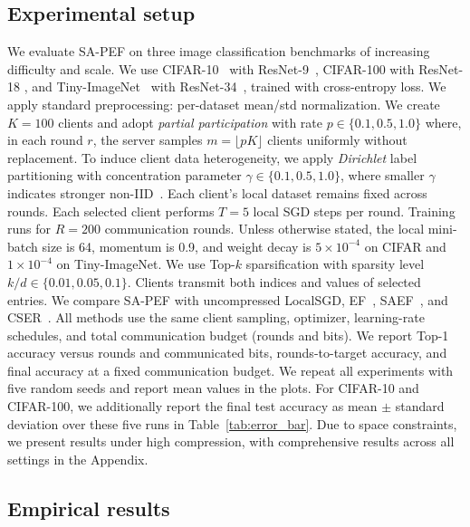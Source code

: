 \documentclass{article} %
\begin{document}
\subsection{Experimental setup}

We evaluate SA-PEF on three image classification benchmarks of increasing difficulty and scale. We use CIFAR-10~\citep{krizhevsky2009} with ResNet-9~\citep{page_cifar10_fast}, {CIFAR-100} \cite{krizhevsky2009} with {ResNet-18} \cite{he2016deep}, and {Tiny-ImageNet}~\citep{le2015tiny} with {ResNet-34}~\citep{he2016deep}, trained with cross-entropy loss. We apply standard preprocessing: per-dataset mean/std normalization. We create \(K=100\) clients and adopt \emph{partial participation} with rate \(p\in\{0.1,0.5,1.0\}\) where, in each round \(r\), the server samples \(m=\lfloor pK\rfloor\) clients uniformly without replacement. To induce client data heterogeneity, we apply \emph{Dirichlet} label partitioning with concentration parameter \(\gamma\in\{0.1,0.5,1.0\}\), where smaller \(\gamma\) indicates stronger non-IID~\citep{hsu2019measuring}. Each client’s local dataset remains fixed across rounds. Each selected client performs \(T=5\) local SGD steps per round. Training runs for \(R=200\) communication rounds. Unless otherwise stated, the local mini-batch size is 64, momentum is 0.9, and weight decay is \(5\times10^{-4}\) on CIFAR and \(1\times10^{-4}\) on Tiny-ImageNet. We use {Top-}\(k\) sparsification with sparsity level \(k/d\in\{0.01,0.05,0.1\}\). Clients transmit both indices and values of selected entries. We compare SA-PEF with {uncompressed LocalSGD}, {EF}~\citep{li2023analysis}, {SAEF}~\citep{xu2021step}, and {CSER}~\citep{xie2020cser}. All methods use the same client sampling, optimizer, learning-rate schedules, and total communication budget (rounds and bits). We report Top-1 accuracy versus rounds and communicated bits, rounds-to-target accuracy, and final accuracy at a fixed communication budget. We repeat all experiments with five random seeds and report mean values in the plots. For CIFAR-10 and CIFAR-100, we additionally report the final test accuracy as mean $\pm$ standard deviation over these five runs in Table~\ref{tab:error_bar}. Due to space constraints, we present results under high compression, with comprehensive results across all settings in the Appendix.

\subsection{Empirical results}
\end{document}
